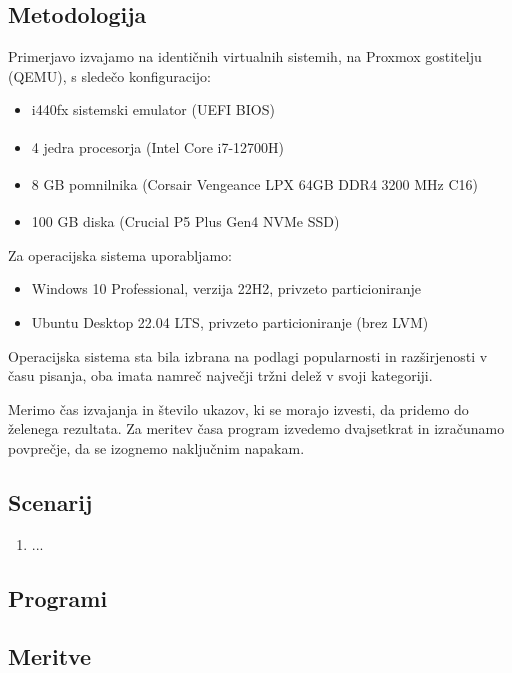 \documentclass[a4paper,12pt,openright]{book}
\begin{document}
\subsection{Metodologija} \label{ssec:process_control:methodology}

Primerjavo izvajamo na identičnih virtualnih sistemih, na Proxmox gostitelju (QEMU), s sledečo konfiguracijo:
\begin{itemize}
	\item i440fx sistemski emulator (UEFI BIOS)
	\item 4 jedra procesorja (Intel\textsuperscript{\textregistered} Core\textsuperscript{\texttrademark} i7-12700H)
	\item 8 GB pomnilnika (Corsair\textsuperscript{\textregistered} Vengeance\textsuperscript{\textregistered} LPX 64GB DDR4 3200 MHz C16)
	\item 100 GB diska (Crucial\textsuperscript{\textregistered} P5 Plus Gen4 NVMe SSD)
\end{itemize}

Za operacijska sistema uporabljamo:
\begin{itemize}
	\item Windows 10 Professional, verzija 22H2, privzeto particioniranje
	\item Ubuntu Desktop 22.04 LTS, privzeto particioniranje (brez LVM)
\end{itemize}
Operacijska sistema sta bila izbrana na podlagi popularnosti in razširjenosti v času pisanja, oba imata namreč največji tržni delež v svoji kategoriji.

Merimo čas izvajanja in število ukazov, ki se morajo izvesti, da pridemo do želenega rezultata.
Za meritev časa program izvedemo dvajsetkrat in izračunamo povprečje, da se izognemo naključnim napakam.

\subsection{Scenarij}

\begin{enumerate}
	\item ...
\end{enumerate}

\subsection{Programi}

\subsection{Meritve}
\end{document}
